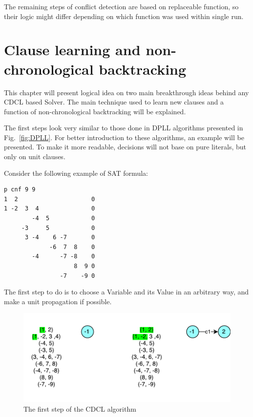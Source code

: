 \documentclass[12pt,english,pdflatex]{aghdpl}
\begin{document}
The remaining steps of conflict detection are based on replaceable function,
so their logic might differ depending on which function was used
within single run.

\section{Clause learning and non-chronological backtracking}

This chapter will present logical idea on two main breakthrough ideas
behind any CDCL based Solver. The main technique used to learn new clauses
and a function of non-chronological backtracking will be explained. 

The first steps look very similar
to those done in DPLL algorithms presented in Fig.~\ref{fig:DPLL}.
For better introduction to these algorithms, an example will be presented.
To make it more readable, decisions will not base on pure
literals, but only on unit clauses.

Consider the following example of SAT formula:

\begin{lstlisting}
p cnf 9 9
1  2                     0
1 -2  3  4               0
        -4  5            0
     -3     5            0
      3 -4    6 -7       0
             -6  7  8    0
        -4      -7 -8    0
                    8  9 0
                -7    -9 0
\end{lstlisting}
The first step to do is to choose  a Variable and its Value in an arbitrary way, and make
a unit propagation if possible. 

\begin{figure}[H]
\begin{centering}
\includegraphics[scale=0.8]{img/CDCL_1}
\par\end{centering}
\caption{The first step of the CDCL algorithm}
\end{figure}
\end{document}
